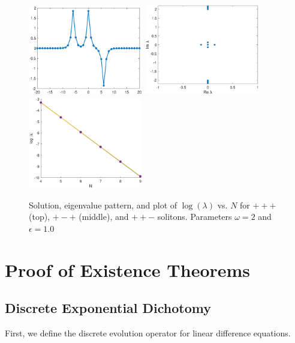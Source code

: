 \documentclass[12pt]{article}
\begin{document}
\begin{figure}[H]
\includegraphics[width=5cm]{dnlsPPM.eps}
\includegraphics[width=5cm]{dnlsPPMeig.eps}
\includegraphics[width=5cm]{dnlsPPMdecay.eps}
\label{fig:eigendecay2}
\caption{Solution, eigenvalue pattern, and plot of $\log(\lambda)$ vs. $N$ for $+++$ (top), $+-+$ (middle), and $++-$ solitons. Parameters $\omega = 2$ and $\epsilon = 1.0$}
\end{figure}

\section{Proof of Existence Theorems}

\subsection{Discrete Exponential Dichotomy}

First, we define the discrete evolution operator for linear difference equations.
\end{document}
